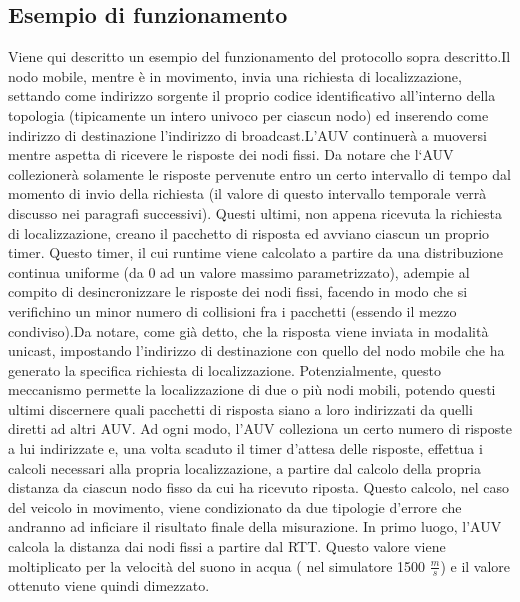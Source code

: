 \documentclass[Lau,binding=0.6cm]{sapthesis}
\begin{document}
\subsection{Esempio di funzionamento}
Viene qui descritto un esempio del funzionamento del protocollo sopra descritto.\newline Il nodo mobile, mentre è in movimento, invia una richiesta di localizzazione, settando come indirizzo sorgente il proprio codice identificativo all'interno della topologia (tipicamente un intero univoco per ciascun nodo)
ed inserendo come indirizzo di destinazione l'indirizzo di broadcast.\newline L'AUV continuerà a muoversi mentre aspetta di ricevere le risposte dei nodi fissi. Da notare che l`AUV collezionerà solamente le risposte pervenute entro un certo intervallo di tempo dal momento di invio della richiesta (il valore di questo intervallo temporale verrà discusso nei paragrafi successivi).\newline
Questi ultimi, non appena ricevuta la richiesta di localizzazione, creano il pacchetto di risposta ed avviano ciascun un proprio timer. Questo timer, il cui runtime viene calcolato a partire da una distribuzione continua uniforme (da 0 ad un valore massimo parametrizzato), adempie al compito di desincronizzare le risposte dei nodi fissi,
facendo in modo che si verifichino un minor numero di collisioni fra i pacchetti (essendo il mezzo condiviso).\newline Da notare, come già detto, che la risposta viene inviata in modalità unicast, impostando l'indirizzo di destinazione con quello del nodo mobile che ha generato la specifica richiesta di localizzazione. Potenzialmente, questo meccanismo permette la localizzazione di due o più nodi mobili, potendo questi ultimi discernere quali pacchetti di risposta siano a loro indirizzati da quelli diretti ad altri AUV.\newline
Ad ogni modo, l'AUV colleziona un certo numero di risposte a lui indirizzate e, una volta scaduto il timer d'attesa delle risposte, effettua i calcoli necessari alla propria localizzazione, a partire dal calcolo della propria distanza da ciascun nodo fisso da cui ha ricevuto riposta.\newline
Questo calcolo, nel caso del veicolo in movimento, viene condizionato da due tipologie d'errore che andranno ad inficiare il risultato finale della misurazione. 
In primo luogo, l'AUV calcola la distanza dai nodi fissi a partire dal RTT. Questo valore viene moltiplicato per la velocità del suono in acqua ( nel simulatore 1500 $\frac{m}{s}$) e il valore ottenuto viene quindi dimezzato.
\end{document}
